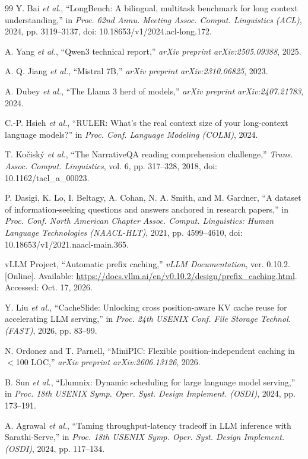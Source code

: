 \begin{thebibliography}{99}
Y. Bai \emph{et al.}, ``LongBench: A bilingual, multitask benchmark for long context understanding,'' in \emph{Proc. 62nd Annu. Meeting Assoc. Comput. Linguistics (ACL)}, 2024, pp. 3119--3137, doi: 10.18653/v1/2024.acl-long.172.

A. Yang \emph{et al.}, ``Qwen3 technical report,'' \emph{arXiv preprint arXiv:2505.09388}, 2025.

A. Q. Jiang \emph{et al.}, ``Mistral 7B,'' \emph{arXiv preprint arXiv:2310.06825}, 2023.

A. Dubey \emph{et al.}, ``The Llama 3 herd of models,'' \emph{arXiv preprint arXiv:2407.21783}, 2024.

C.-P. Hsieh \emph{et al.}, ``RULER: What's the real context size of your long-context language models?'' in \emph{Proc. Conf. Language Modeling (COLM)}, 2024.

T. Ko\v{c}isk\'{y} \emph{et al.}, ``The NarrativeQA reading comprehension challenge,'' \emph{Trans. Assoc. Comput. Linguistics}, vol. 6, pp. 317--328, 2018, doi: 10.1162/tacl\_a\_00023.

P. Dasigi, K. Lo, I. Beltagy, A. Cohan, N. A. Smith, and M. Gardner, ``A dataset of information-seeking questions and answers anchored in research papers,'' in \emph{Proc. Conf. North American Chapter Assoc. Comput. Linguistics: Human Language Technologies (NAACL-HLT)}, 2021, pp. 4599--4610, doi: 10.18653/v1/2021.naacl-main.365.

vLLM Project, ``Automatic prefix caching,'' \emph{vLLM Documentation}, ver. 0.10.2. [Online]. Available: \url{https://docs.vllm.ai/en/v0.10.2/design/prefix_caching.html}. Accessed: Oct. 17, 2026.

Y. Liu \emph{et al.}, ``CacheSlide: Unlocking cross position-aware KV cache reuse for accelerating LLM serving,'' in \emph{Proc. 24th USENIX Conf. File Storage Technol. (FAST)}, 2026, pp. 83--99.

N. Ordonez and T. Parnell, ``MiniPIC: Flexible position-independent caching in $<$100 LOC,'' \emph{arXiv preprint arXiv:2606.13126}, 2026.

B. Sun \emph{et al.}, ``Llumnix: Dynamic scheduling for large language model serving,'' in \emph{Proc. 18th USENIX Symp. Oper. Syst. Design Implement. (OSDI)}, 2024, pp. 173--191.

A. Agrawal \emph{et al.}, ``Taming throughput-latency tradeoff in LLM inference with Sarathi-Serve,'' in \emph{Proc. 18th USENIX Symp. Oper. Syst. Design Implement. (OSDI)}, 2024, pp. 117--134.


\end{thebibliography}
